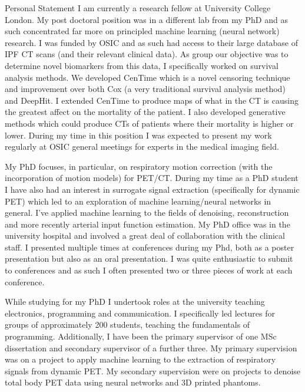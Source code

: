 \documentclass{cv}
\begin{document}

    \newpage

    \begin{rSection}{Personal Statement}
        I am currently a research fellow at University College London. My post doctoral position was in a different lab from my PhD and as such concentrated far more on principled machine learning (neural network) research. I was funded by OSIC and as such had access to their large database of IPF CT scans (and their relevant clinical data). As group our objective was to determine novel biomarkers from this data, I specifically worked on survival analysis methods. We developed CenTime which is a novel censoring technique and improvement over both Cox (a very traditional survival analysis method) and DeepHit. I extended CenTime to produce maps of what in the CT is causing the greatest affect on the mortality of the patient. I also developed generative methods which could produce CTs of patients where their mortality is higher or lower. During my time in this position I was expected to present my work regularly at OSIC general meetings for experts in the medical imaging field.
        
        My PhD focuses, in particular, on respiratory motion correction (with the incorporation of motion models) for PET/CT. During my time as a PhD student I have also had an interest in surrogate signal extraction (specifically for dynamic PET) which led to an exploration of machine learning/neural networks in general. I've applied machine learning to the fields of denoising, reconstruction and more recently arterial input function estimation. My PhD office was in the university hospital and involved a great deal of collaboration with the clinical staff. I presented multiple times at conferences during my Phd, both as a poster presentation but also as an oral presentation. I was quite enthusiastic to submit to conferences and as such I often presented two or three pieces of work at each conference.
        
        While studying for my PhD I undertook roles at the university teaching electronics, programming and communication. I specifically led lectures for groups of approximately 200 students, teaching the fundamentals of programming. Additionally, I have been the primary supervisor of one MSc dissertation and secondary supervisor of a further three. My primary supervision was on a project to apply machine learning to the extraction of respiratory signals from dynamic PET. My secondary supervision were on projects to denoise total body PET data using neural networks and 3D printed phantoms.
        

\end{rSection}
\end{document}
